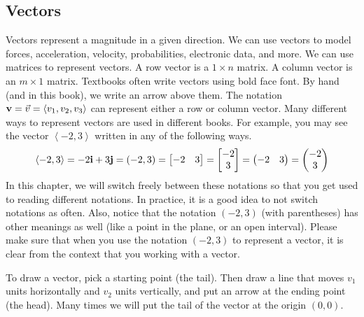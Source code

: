 \subsection{Vectors}
Vectors represent a magnitude in a given direction. We can use vectors to model forces, acceleration, velocity, probabilities, electronic data, and more. We can use matrices to represent vectors. A row vector is a {$1\times n$} matrix. A column vector is an {$m \times 1$} matrix.   Textbooks often write vectors using bold face font. By hand (and in this book), we write an arrow above them. The notation ${\bf v} = \vec v = \left<v_1,v_2,v_3\right>$ can represent either a row or column vector. Many different ways to represent vectors are used in different books.  For example, you may see the vector $\left<-2,3\right>$ written in any of the following ways.
$$\left<-2,3\right>
= -2{\bf i}+3{\bf j} 
= (-2,3) 
= \begin{bmatrix}-2&3\end{bmatrix} 
= \begin{bmatrix}-2\\3\end{bmatrix}
= \begin{pmatrix}-2&3\end{pmatrix} 
= \begin{pmatrix}-2\\3\end{pmatrix}
$$ 
In this chapter, we will switch freely between these notations so that you get used to reading different notations.  In practice, it is a good idea to not switch notations as often.  Also, notice that the notation $(-2,3)$ (with parentheses) has other meanings as well (like a point in the plane, or an open interval).  Please make sure that when you use the notation $(-2,3)$ to represent a vector, it is clear from the context that you working with a vector. 

{}
To draw a vector, pick a starting point (the tail).  Then draw a line that moves $v_1$ units horizontally and $v_2$ units vertically, and put an arrow at the ending point (the head).  Many times we will put the tail of the vector at the origin $(0,0)$.


